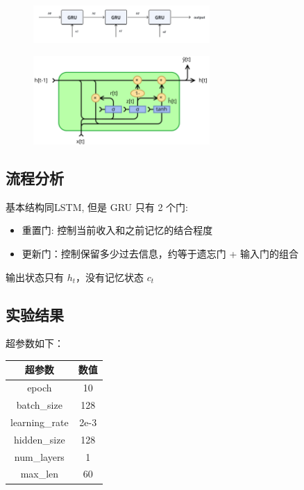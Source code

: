 \documentclass{article}
\begin{document}
\begin{figure}[htbp]
    \centering
    \includegraphics[width=0.6\textwidth]{img/gru.png}
\end{figure}

\FloatBarrier

\begin{figure}[htbp]
    \centering
    \includegraphics[width=0.6\textwidth]{img/Gated_Recurrent_Unit_base_type.svg.png}
\end{figure}

\FloatBarrier

\subsection{流程分析}
基本结构同LSTM, 但是 GRU 只有 2 个门:

\begin{itemize}
    \item 重置门: 控制当前收入和之前记忆的结合程度
    \item 更新门：控制保留多少过去信息，约等于遗忘门 + 输入门的组合
\end{itemize}

输出状态只有 $h_t$，没有记忆状态 $c_t$

\subsection{实验结果}
超参数如下：

\begin{table}[H]  
    \centering        
    \begin{tabular}{|c|c|}
    \hline
    {\bf 超参数} & {\bf 数值} \\
    \hline
    epoch & 10  \\
    \hline
    batch\_size & 128  \\
    \hline
    learning\_rate & 2e-3  \\
    \hline
    hidden\_size & 128 \\
    \hline
    num\_layers & 1 \\
    \hline
    max\_len & 60 \\
    \hline
    \end{tabular}
\end{table}
\end{document}
